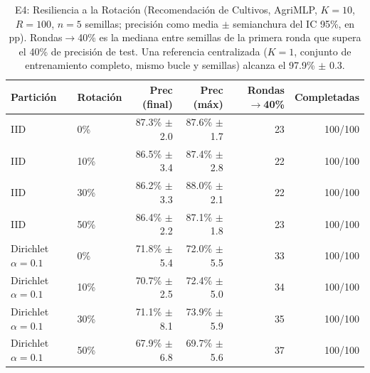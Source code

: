 \documentclass[journal]{IEEEtran}
\begin{document}
\begin{table}[t]
\centering
\caption{E4: Resiliencia a la Rotación (Recomendación de Cultivos, AgriMLP, $K{=}10$, $R{=}100$, $n{=}5$ semillas; precisión como media $\pm$ semianchura del IC 95\%, en pp). Rondas$\to$40\% es la mediana entre semillas de la primera ronda que supera el 40\% de precisión de test. Una referencia centralizada ($K{=}1$, conjunto de entrenamiento completo, mismo bucle y semillas) alcanza el 97.9\% $\pm$ 0.3.}
\label{tab:e4}
\footnotesize
\begin{tabular}{l l r r r r}
\toprule
\textbf{Partición} & \textbf{Rotación} & \textbf{Prec (final)} & \textbf{Prec (máx)} & \textbf{Rondas$\to$40\%} & \textbf{Completadas} \\
\midrule
IID & 0\%  & 87.3\% $\pm$ 2.0 & 87.6\% $\pm$ 1.7 & 23 & 100/100 \\
IID & 10\% & 86.5\% $\pm$ 3.4 & 87.4\% $\pm$ 2.8 & 22 & 100/100 \\
IID & 30\% & 86.2\% $\pm$ 3.3 & 88.0\% $\pm$ 2.1 & 22 & 100/100 \\
IID & 50\% & 86.4\% $\pm$ 2.2 & 87.1\% $\pm$ 1.8 & 23 & 100/100 \\
\midrule
Dirichlet $\alpha{=}0.1$ & 0\%  & 71.8\% $\pm$ 5.4 & 72.0\% $\pm$ 5.5 & 33 & 100/100 \\
Dirichlet $\alpha{=}0.1$ & 10\% & 70.7\% $\pm$ 2.5 & 72.4\% $\pm$ 5.0 & 34 & 100/100 \\
Dirichlet $\alpha{=}0.1$ & 30\% & 71.1\% $\pm$ 8.1 & 73.9\% $\pm$ 5.9 & 35 & 100/100 \\
Dirichlet $\alpha{=}0.1$ & 50\% & 67.9\% $\pm$ 6.8 & 69.7\% $\pm$ 5.6 & 37 & 100/100 \\
\bottomrule
\end{tabular}
\end{table}
\end{document}
